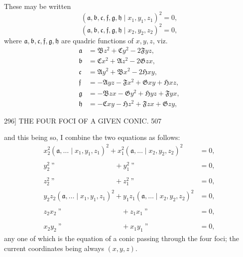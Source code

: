 \documentclass[11pt]{article}
\begin{document}
These may be written
\[ (\mathfrak{a},\mathfrak{b},\mathfrak{c},\mathfrak{f},\mathfrak{g},\mathfrak{h} \mid x_{1},y_{1},z_{1})^{2}=0, \]
\[ (\mathfrak{a},\mathfrak{b},\mathfrak{c},\mathfrak{f},\mathfrak{g},\mathfrak{h} \mid x_{2},y_{2},z_{2})^{2}=0, \]
where $\mathfrak{a},\mathfrak{b},\mathfrak{c},\mathfrak{f},\mathfrak{g},\mathfrak{h}$ are quadric functions of $x,y,z$, viz.
\[ \begin{aligned}
\mathfrak{a} &= \mathfrak{B}z^{2}+\mathfrak{C}y^{2}-2\mathfrak{F}yz,\\
\mathfrak{b} &= \mathfrak{C}x^{2}+\mathfrak{A}z^{2}-2\mathfrak{G}zx,\\
\mathfrak{c} &= \mathfrak{A}y^{2}+\mathfrak{B}x^{2}-2\mathfrak{H}xy,\\
\mathfrak{f} &= -\mathfrak{A}yz-\mathfrak{F}x^{2}+\mathfrak{G}xy+\mathfrak{H}xz,\\
\mathfrak{g} &= -\mathfrak{B}zx-\mathfrak{G}y^{2}+\mathfrak{H}yz+\mathfrak{F}yx,\\
\mathfrak{h} &= -\mathfrak{C}xy-\mathfrak{H}z^{2}+\mathfrak{F}zx+\mathfrak{G}zy,
\end{aligned} \]

\newpage
\begin{center}
296] \hfill THE FOUR FOCI OF A GIVEN CONIC. \hfill 507
\end{center}

and this being so, I combine the two equations as follows:
\[ \begin{aligned}
x_{2}^{2}(\mathfrak{a},\ldots\mid x_{1},y_{1},z_{1})^{2}+x_{1}^{2}(\mathfrak{a},\ldots\mid x_{2},y_{2},z_{2})^{2} &=0,\\
y_{2}^{2}\ \text{''}\ \phantom{(\mathfrak{a},\ldots\mid x_{1},y_{1},z_{1})^{2}}+y_{1}^{2}\ \text{''} &=0,\\
z_{2}^{2}\ \text{''}\ \phantom{(\mathfrak{a},\ldots\mid x_{1},y_{1},z_{1})^{2}}+z_{1}^{2}\ \text{''} &=0,\\
y_{2}z_{2}(\mathfrak{a},\ldots\mid x_{1},y_{1},z_{1})^{2}+y_{1}z_{1}(\mathfrak{a},\ldots\mid x_{2},y_{2},z_{2})^{2} &=0,\\
z_{2}x_{2}\ \text{''}\ \phantom{(\mathfrak{a},\ldots\mid x_{1},y_{1},z_{1})^{2}}+z_{1}x_{1}\ \text{''} &=0,\\
x_{2}y_{2}\ \text{''}\ \phantom{(\mathfrak{a},\ldots\mid x_{1},y_{1},z_{1})^{2}}+x_{1}y_{1}\ \text{''} &=0,
\end{aligned} \]
any one of which is the equation of a conic passing through the four foci; the current coordinates being always $(x,y,z)$.
\end{document}
